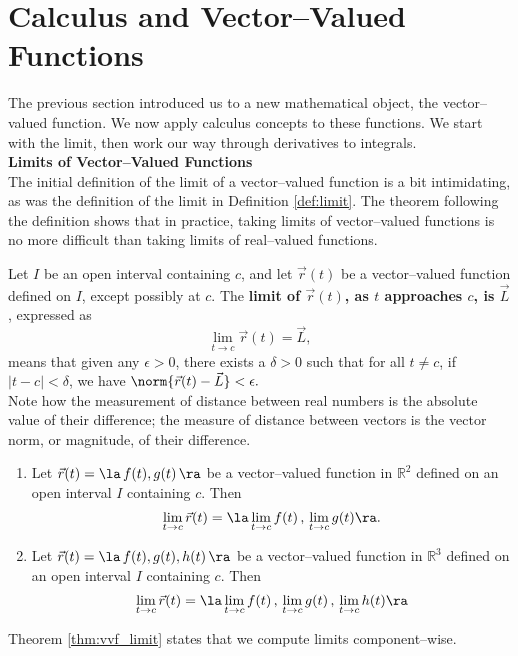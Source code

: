 \section{Calculus and Vector--Valued Functions}\label{sec:vvf_calc}

The previous section introduced us to a new mathematical object, the vector--valued function. We now apply calculus concepts to these functions. We start with the limit, then work our way through derivatives to integrals.\\

\noindent\textbf{\large Limits of Vector--Valued Functions}\\

The initial definition of the limit of a vector--valued function is a bit intimidating, as was the definition of the limit in Definition \ref{def:limit}. The theorem following the definition shows that in practice, taking limits of vector--valued functions is no more difficult than taking limits of real--valued functions.

{Let $I$ be an open interval containing $c$, and let $\vec r(t)$ be a vector--valued function defined on $I$, except possibly at $c$. %
The \textbf{limit of $\vec r(t)$, as $t$ approaches $c$, is $\vec L$}, expressed as 
$$\lim_{t\to c} \vec r(t) = \vec L,$$ means that given any $\epsilon>0$, there exists a $\delta>0$ such that for all $t\neq c$, if $|t-c| <\delta$, we have $\norm{\vec r(t) - \vec L} < \epsilon.$
}\\

Note how the measurement of distance between real numbers is the absolute value of their difference; the measure of distance between vectors is the vector norm, or magnitude, of their difference.

{\begin{enumerate}
	\item Let $\vec r(t) = \la \,f(t),g(t)\,\ra$ be a vector--valued function in $\mathbb{R}^2$ defined on an open interval $I$ containing $c$. Then
	$$\lim_{t\to c} \vec r(t) = \la \lim_{t\to c}f(t)\, , \,\lim_{t\to c} g(t)\ra.$$
	\item Let $\vec r(t) = \la \,f(t),g(t),h(t)\,\ra$ be a vector--valued function in $\mathbb{R}^3$ defined on an open interval $I$ containing $c$. Then 
	$$\lim_{t\to c} \vec r(t) = \la \lim_{t\to c}f(t)\, , \,\lim_{t\to c} g(t)\,, \,\lim_{t\to c} h(t)\ra$$
\end{enumerate}
}
Theorem \ref{thm:vvf_limit} states that we compute limits component--wise.\\

